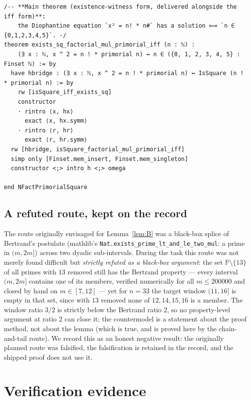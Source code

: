 \documentclass[11pt]{article}
\theoremstyle{definition}
\begin{document}
\begin{lstlisting}
/-- **Main theorem (existence-witness form, delivered alongside the iff form)**:
    the Diophantine equation `x² = n! * n#` has a solution ⟺ `n ∈ {0,1,2,3,4,5}`. -/
theorem exists_sq_factorial_mul_primorial_iff (n : ℕ) :
    (∃ x : ℕ, x ^ 2 = n ! * primorial n) ↔ n ∈ ({0, 1, 2, 3, 4, 5} : Finset ℕ) := by
  have hbridge : (∃ x : ℕ, x ^ 2 = n ! * primorial n) ↔ IsSquare (n ! * primorial n) := by
    rw [isSquare_iff_exists_sq]
    constructor
    · rintro ⟨x, hx⟩
      exact ⟨x, hx.symm⟩
    · rintro ⟨r, hr⟩
      exact ⟨r, hr.symm⟩
  rw [hbridge, isSquare_factorial_mul_primorial_iff]
  simp only [Finset.mem_insert, Finset.mem_singleton]
  constructor <;> intro h <;> omega

end NFactPrimorialSquare
\end{lstlisting}

\subsection{A refuted route, kept on the record}\label{sec:refuted}

The route originally envisaged for Lemma~\ref{lem:B} was a black-box splice
of Bertrand's postulate (mathlib's
\texttt{Nat.exists\_prime\_lt\_and\_le\_two\_mul}: a prime in $(m, 2m]$)
across two dyadic sub-intervals. During the task this route was not merely
found difficult but \emph{strictly refuted as a black-box argument}: the set
$\mathbb{P} \setminus \{13\}$ of all primes with $13$ removed still has the
Bertrand property --- every interval $(m, 2m]$ contains one of its members,
verified numerically for all $m \le 200000$ and closed by hand on
$m \in [7, 12]$ --- yet for $n = 33$ the target window $(11, 16]$ is empty in
that set, since with $13$ removed none of $12, 14, 15, 16$ is a member. The
window ratio $3/2$ is strictly below the Bertrand ratio $2$, so no
property-level argument at ratio $2$ can close it; the countermodel is a
statement about the proof method, not about the lemma (which is true, and is
proved here by the chain-and-tail route). We record this as an
honest negative result: the originally planned route was falsified, the
falsification is retained in the record, and the shipped proof does
not use it.

\section{Verification evidence}\label{sec:verify}
\end{document}
